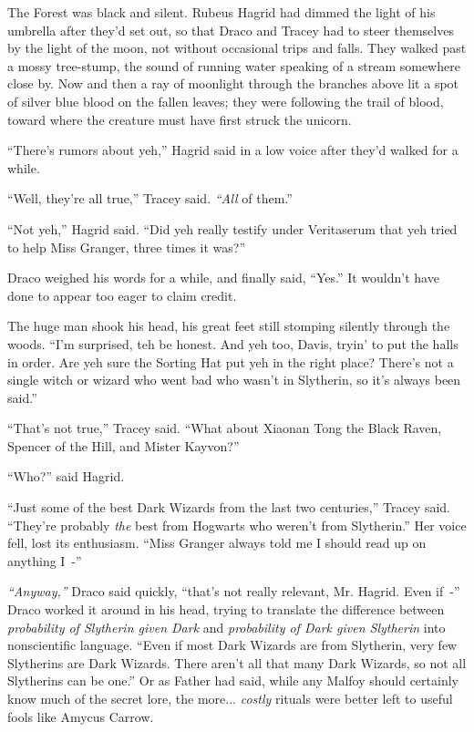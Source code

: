 The Forest was black and silent. Rubeus Hagrid had dimmed the light of his umbrella after they'd set out, so that Draco and Tracey had to steer themselves by the light of the moon, not without occasional trips and falls. They walked past a mossy tree-stump, the sound of running water speaking of a stream somewhere close by. Now and then a ray of moonlight through the branches above lit a spot of silver blue blood on the fallen leaves; they were following the trail of blood, toward where the creature must have first struck the unicorn.

``There's rumors about yeh,'' Hagrid said in a low voice after they'd walked for a while.

``Well, they're all true,'' Tracey said. \emph{``All} of them.''

``Not yeh,'' Hagrid said. ``Did yeh really testify under Veritaserum that yeh tried to help Miss Granger, three times it was?''

Draco weighed his words for a while, and finally said, ``Yes.'' It wouldn't have done to appear too eager to claim credit.

The huge man shook his head, his great feet still stomping silently through the woods. ``I'm surprised, teh be honest. And yeh too, Davis, tryin' to put the halls in order. Are yeh sure the Sorting Hat put yeh in the right place? There's not a single witch or wizard who went bad who wasn't in Slytherin, so it's always been said.''

``That's not true,'' Tracey said. ``What about Xiaonan Tong the Black Raven, Spencer of the Hill, and Mister Kayvon?''

``Who?'' said Hagrid.

``Just some of the best Dark Wizards from the last two centuries,'' Tracey said. ``They're probably \emph{the} best from Hogwarts who weren't from Slytherin.'' Her voice fell, lost its enthusiasm. ``Miss Granger always told me I should read up on anything I~-''

\emph{``Anyway,''} Draco said quickly, ``that's not really relevant, Mr. Hagrid. Even if~-'' Draco worked it around in his head, trying to translate the difference between \emph{probability of Slytherin given Dark} and \emph{probability of Dark given Slytherin} into nonscientific language. ``Even if most Dark Wizards are from Slytherin, very few Slytherins are Dark Wizards. There aren't all that many Dark Wizards, so not all Slytherins can be one.'' Or as Father had said, while any Malfoy should certainly know much of the secret lore, the more... \emph{costly} rituals were better left to useful fools like Amycus Carrow.


